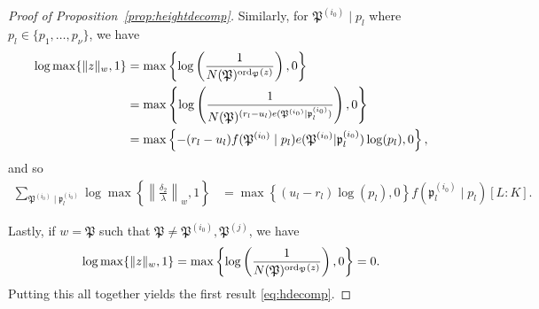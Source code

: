 \begin{proof}[Proof of Proposition~\ref{prop:heightdecomp}]
Similarly, for $\mathfrak{P}^{(i_0)}\mid p_l$ where $p_l \in \{p_1, \dots, p_{\nu}\}$, we have
\begin{align*}
 \log \max \{ \|z\|_{w}, 1\}	
 	& = \max \left\{ \log\left(\frac{1}{N(\mathfrak{P})^{\operatorname{ord}_{\mathfrak{P}}(z)}} \right), 0\right\}\\
	& = \max \left\{ \log\left(\frac{1}{N(\mathfrak{P})^{(r_l - u_l)e(\mathfrak{P}^{(i_0)}|\mathfrak{p}_l^{(i_0)})}} \right), 0\right\}\\
	& = \max \left\{ -(r_l - u_l)f(\mathfrak{P}^{(i_0)}\mid p_l)e(\mathfrak{P}^{(i_0)}|\mathfrak{p}_l^{(i_0)})\log(p_l), 0\right\},
\end{align*}
and so
\begin{align*}
\sum_{\mathfrak{P}^{(i_0)} \mid \mathfrak{p}_l^{(i_0)}} \log \max \left\{ \left\|\frac{\delta_2}{\lambda}\right\|_{w}, 1\right\}
	& = \max \left\{ (u_l - r_l)\log(p_l), 0\right\}f(\mathfrak{p}_l^{(i_0)}\mid p_l)[L:K].
\end{align*}

Lastly, if $w = \mathfrak{P}$ such that $\mathfrak{P} \neq \mathfrak{P}^{(i_0)},  \mathfrak{P}^{(j)}$, we have
\[\log \max \{ \|z\|_{w}, 1\} = \max \left\{ \log\left(\frac{1}{N(\mathfrak{P})^{\operatorname{ord}_{\mathfrak{P}}(z)}} \right), 0\right\}=0.\]
Putting this all together yields the first result \eqref{eq:hdecomp}. 


\end{proof}
